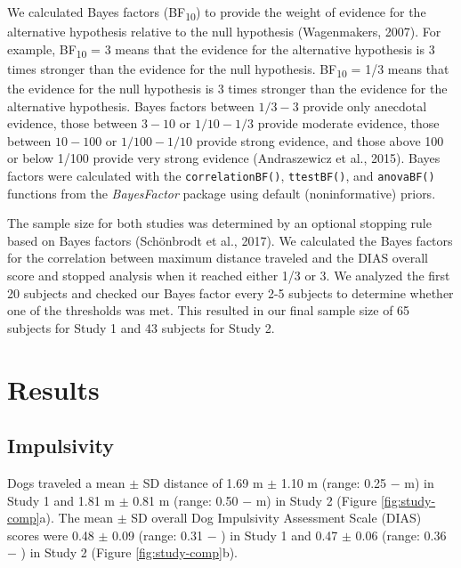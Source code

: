 \documentclass[
  pub,floatsintext]{apa6}
\begin{document}
We calculated Bayes factors (BF\textsubscript{10}) to provide the weight of evidence for the alternative hypothesis relative to the null hypothesis (Wagenmakers, 2007). For example, BF\textsubscript{10} = 3 means that the evidence for the alternative hypothesis is 3 times stronger than the evidence for the null hypothesis. BF\textsubscript{10} = 1/3 means that the evidence for the null hypothesis is 3 times stronger than the evidence for the alternative hypothesis. Bayes factors between \(1/3-3\) provide only anecdotal evidence, those between \(3-10\) or \(1/10-1/3\) provide moderate evidence, those between \(10-100\) or \(1/100-1/10\) provide strong evidence, and those above 100 or below 1/100 provide very strong evidence (Andraszewicz et al., 2015). Bayes factors were calculated with the \texttt{correlationBF()}, \texttt{ttestBF()}, and \texttt{anovaBF()} functions from the \emph{BayesFactor} package using default (noninformative) priors.

The sample size for both studies was determined by an optional stopping rule based on Bayes factors (Schönbrodt et al., 2017). We calculated the Bayes factors for the correlation between maximum distance traveled and the DIAS overall score and stopped analysis when it reached either 1/3 or 3. We analyzed the first 20 subjects and checked our Bayes factor every 2-5 subjects to determine whether one of the thresholds was met. This resulted in our final sample size of 65 subjects for Study 1 and 43 subjects for Study 2.

\hypertarget{results}{%
\section{Results}\label{results}}

\hypertarget{impulsivity}{%
\subsection{Impulsivity}\label{impulsivity}}

Dogs traveled a mean \(\pm\) SD distance of 1.69 m \(\pm\) 1.10 m (range: 0.25 \negthickspace \(-\)  m) in Study 1 and 1.81 m \(\pm\) 0.81 m (range: 0.50 \negthickspace \(-\)  m) in Study 2 (Figure \ref{fig:study-comp}a). The mean \(\pm\) SD overall Dog Impulsivity Assessment Scale (DIAS) scores were 0.48 \(\pm\) 0.09 (range: 0.31 \negthickspace \(-\) ) in Study 1 and 0.47 \(\pm\) 0.06 (range: 0.36 \negthickspace \(-\) ) in Study 2 (Figure \ref{fig:study-comp}b).
\end{document}
